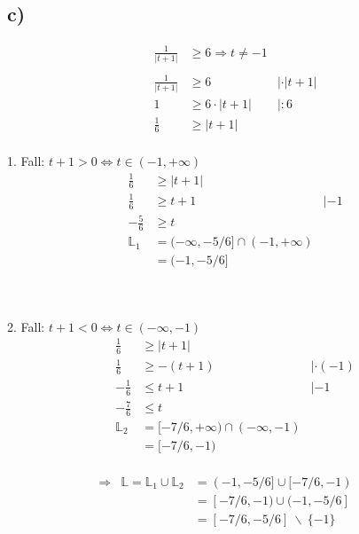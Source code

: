 \documentclass[]{article}
\newcommand{\eq}{\Leftrightarrow}
\newcommand{\rarr}{\Rightarrow}
\begin{document}
\subsection*{c)}
\begin{align*}
	&& \frac{1}{|t+1|} &\geq 6 \rarr t \neq -1 & &\\
	\\
	&& \frac{1}{|t+1|} &\geq 6& | \cdot |t+1|&\\
	&& 1 &\geq 6 \cdot |t+1|& |:6&\\
	&& \frac{1}{6} &\geq |t+1|&&\\
\end{align*}
\begin{center}\begin{minipage}{0.45\textwidth}
	1. Fall: $t+1 > 0 \eq t \in (-1,+\infty)$
	\begin{align*}
		&& \frac{1}{6} &\geq |t+1|  &&\\
		&& \frac{1}{6} &\geq t+1  &|-1&\\
		&& -\frac{5}{6} &\geq t  &&\\
		&& \mathbb{L}_1&= (-\infty,-5/6] \cap (-1,+\infty)&&\\
		&& &= (-1,-5/6]&&\\
	\end{align*}
\end{minipage} ~\vline~ \begin{minipage}{0.45\textwidth}
	2. Fall: $t+1 < 0 \eq t \in (-\infty,-1)$
	\begin{align*}
		&& \frac{1}{6} &\geq |t+1|&&\\
		&& \frac{1}{6} &\geq -(t+1)&|\cdot(-1)&\\
		&& -\frac{1}{6} &\leq t+1&|-1&\\
		&& -\frac{7}{6} &\leq t&&\\
		&& \mathbb{L}_2&= [-7/6,+\infty) \cap (-\infty,-1)&&\\
		&& &= [-7/6,-1)&&\\
	\end{align*}
\end{minipage}\end{center}
\begin{align*}
	&\rarr& \mathbb{L} = \mathbb{L}_1 \cup \mathbb{L}_2 &= (-1,-5/6] \cup [-7/6,-1) &&\\
	&& &= [-7/6,-1) \cup (-1,-5/6] &&\\
	&& &= [-7/6,-5/6] ~ \backslash ~ \{-1\} &&\\
\end{align*}
\end{document}
